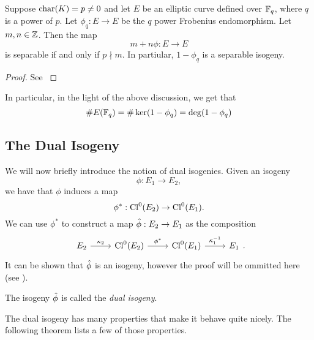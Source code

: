 \begin{proposition}
	\label{prop:frobenius-separable}
	Suppose $\operatorname{char}(K) = p \neq 0$ and
	let $E$ be an elliptic curve defined over
	$\mathbb{F}_q$, where $q$ is a power of $p$. 
	Let $\phi_q: E \to E$ be the
	$q$ power Frobenius endomorphism.
	Let $m, n \in \mathbb{Z}$.
	Then the map
	\begin{equation*}
		m + n\phi: E\to E
	\end{equation*}
	is separable if and only if $p\nmid m$.
	In partiular, $1 - \phi_q$ is a separable isogeny.
\end{proposition}
\begin{proof}
	See \cite[III.5.5]{silverman}
\end{proof}

In particular, in the light of the above discussion, we get that
\begin{equation*}
	\#E(\mathbb{F}_q) = \#\ker(1 - \phi_q) = \deg(1 - \phi_q)
\end{equation*}

\subsection{The Dual Isogeny}

We will now briefly introduce the notion of dual isogenies. 
Given an isogeny
\begin{equation*}
	\phi: E_1 \to E_2,
\end{equation*}
we have that $\phi$ induces a map
\begin{equation*}
	\phi^*: \operatorname{Cl}^0(E_2) \to \operatorname{Cl}^0(E_1).
\end{equation*}
We can use $\phi^*$ to construct a map $\Hat\phi: E_2 \to E_1$
as the composition
\begin{equation*}
	\begin{tikzcd}
		{E_2} & {\Cl^0(E_2)} & {\Cl^0(E_1)} & {E_1}
		\arrow["{\kappa_2}", from=1-1, to=1-2]
		\arrow["{\phi^*}", from=1-2, to=1-3]
		\arrow["{\kappa_1^{-1}}", from=1-3, to=1-4]
	\end{tikzcd}.
\end{equation*}
It can be shown that $\Hat\phi$ is an isogeny, however the proof will be
ommitted here (see \cite[III.6.1]{silverman}).

\begin{definition}
	The isogeny $\Hat\phi$ is called the \emph{dual isogeny}.
\end{definition}

The dual isogeny has many properties that make it behave quite nicely.
The following theorem lists a few of those properties.

